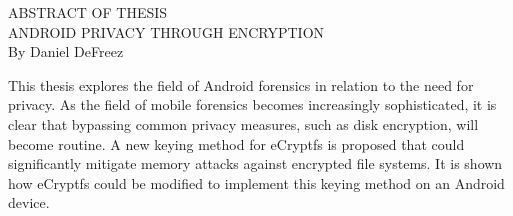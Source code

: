 \singlespacing
\begin{center}
ABSTRACT OF THESIS \\[1.0in]
ANDROID PRIVACY THROUGH ENCRYPTION \\[0.25in]
By Daniel DeFreez \\[1.25in]
\end{center}

\noindent
This thesis explores the field of Android forensics in relation to the need for privacy. As the field of mobile forensics becomes
increasingly sophisticated, it is clear that bypassing common privacy measures, such as disk encryption, will become routine.  A new
keying method for eCryptfs is proposed that could significantly mitigate memory attacks against encrypted file systems. It is shown
how eCryptfs could be modified to implement this keying method on an Android device.
\restoregeometry
